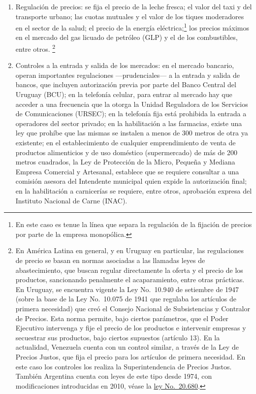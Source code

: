 \documentclass[
  12pt,
  spanish,
]{book}
\begin{document}
\begin{enumerate}
\def\labelenumi{\arabic{enumi}.}
\item
  Regulación de precios: se fija el precio de la leche fresca; el valor del taxi y del transporte urbano; las cuotas mutuales y el valor de los tiques moderadores en el sector de la salud; el precio de la energía eléctrica;\footnote{En este caso es tenue la línea que separa la regulación de la fijación de precios por parte de la empresa monopólica.} los precios máximos en el mercado del gas licuado de petróleo (GLP) y el de los combustibles, entre otros.
  \footnote{En América Latina en general, y en Uruguay en particular, las regulaciones de precio se basan en normas asociadas a las llamadas leyes de abastecimiento, que buscan regular directamente la oferta y el precio de los productos, sancionando penalmente el acaparamiento, entre otras prácticas. En Uruguay, se encuentra vigente la Ley No.~10.940 de setiembre de 1947 (sobre la base de la Ley No.~10.075 de 1941 que regulaba los artículos de primera necesidad) que creó el Consejo Nacional de Subsistencias y Contralor de Precios. Esta norma permite, bajo ciertos parámetros, que el Poder Ejecutivo intervenga y fije el precio de los productos e intervenir empresas y secuestrar sus productos, bajo ciertos supuestos (artículo 13). En la actualidad, Venezuela cuenta con un control similar, a través de la Ley de Precios Justos, que fija el precio para los artículos de primera necesidad. En este caso los controles los realiza la Superintendencia de Precios Justos. También Argentina cuenta con leyes de este tipo desde 1974, con modificaciones introducidas en 2010, véase la \href{http://infoleg.mecon.gov.ar/infolegInternet/anexos/55000-59999/58603/texact.htm}{ley No.~20.680}.}
\item
  Controles a la entrada y salida de los mercados: en el mercado bancario, operan importantes regulaciones ---prudenciales--- a la entrada y salida de bancos, que incluyen autorización previa por parte del Banco Central del Uruguay (BCU); en la telefonía celular, para entrar al mercado hay que acceder a una frecuencia que la otorga la Unidad Reguladora de los Servicios de Comunicaciones (URSEC); en la telefonía fija está prohibida la entrada a operadores del sector privado; en la habilitación a las farmacias, existe una ley que prohíbe que las mismas se instalen a menos de 300 metros de otra ya existente; en el establecimiento de cualquier emprendimiento de venta de productos alimenticios y de uso doméstico (supermercado) de más de 200 metros cuadrados, la Ley de Protección de la Micro, Pequeña y Mediana Empresa Comercial y Artesanal, establece que se requiere consultar a una comisión asesora del Intendente municipal quien expide la autorización final; en la habilitación a carnicerías se requiere, entre otros, aprobación expresa del Instituto Nacional de Carne (INAC).
\end{enumerate}
\end{document}
